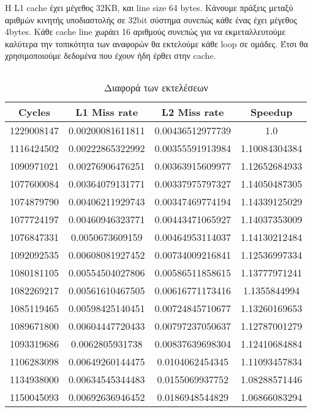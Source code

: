 \documentclass[a4paper,12pt]{article}
\begin{document}
Η L1 cache έχει μέγεθος 32KB, και line size 64 bytes. Κάνουμε πράξεις μεταξύ
αριθμών κινητής υποδιαστολής σε 32bit σύστημα συνεπώς κάθε ένας έχει μέγεθος
4bytes. Κάθε cache line χωράει 16 αριθμούς συνεπώς για να εκμεταλλευτούμε
καλύτερα την τοπικότητα των αναφορών θα εκτελούμε κάθε loop σε ομάδες. Έτσι θα 
χρησιμοποιούμε δεδομένα που έχουν ήδη έρθει στην cache.

\inputminted[linenos,fontsize=\scriptsize,frame=leftline]{c}{files/partA2_scan-v3-partA.c}


\begin{table}[H]
    \centering
    \begin{tabular}{| c | c | c | c |}
        \hline
        Cycles & L1 Miss rate & L2 Miss rate & Speedup  \\
        \hline
        \hline
        1229008147 & 0.00200081611811 & 0.00436512977739 & 1.0 \\
        1116424502 & 0.00222865322992 & 0.00355591913984 & 1.10084304384 \\
        1090971021 & 0.00276906476251 & 0.00363915609977 & 1.12652684933 \\
        1077600084 & 0.00364079131771 & 0.00337975797327 & 1.14050487305 \\
        1074879790 & 0.00406211929743 & 0.00347469774194 & 1.14339125029 \\
        1077724197 & 0.00460946323771 & 0.00443471065927 & 1.14037353009 \\
        1076847331 & 0.0050673609159 & 0.00464953114037 & 1.14130212484 \\
        1092092535 & 0.00608081927452 & 0.00734009216841 & 1.12536997334 \\
        1080181105 & 0.00554504027806 & 0.00586511858615 & 1.13777971241 \\
        1082269217 & 0.00561610467505 & 0.00616771173416 & 1.1355844994 \\
        1085119465 & 0.00598425140451 & 0.00724845710677 & 1.13260169653 \\
        1089671800 & 0.00604447720433 & 0.00797237050637 & 1.12787001279 \\
        1093319686 & 0.0062805931738 & 0.00837639698304 & 1.12410684884 \\
        1106283098 & 0.00649260144475 & 0.0104062454345 & 1.11093457834 \\
        1134938000 & 0.00634545344483 & 0.0155069937752 & 1.08288571446 \\
        1150045093 & 0.00692636946452 & 0.0186948544829 & 1.06866083294 \\
        \hline
    \end{tabular}
    \caption{Διαφορά των εκτελέσεων}
    \label{fig:T4}
\end{table}
\end{document}
